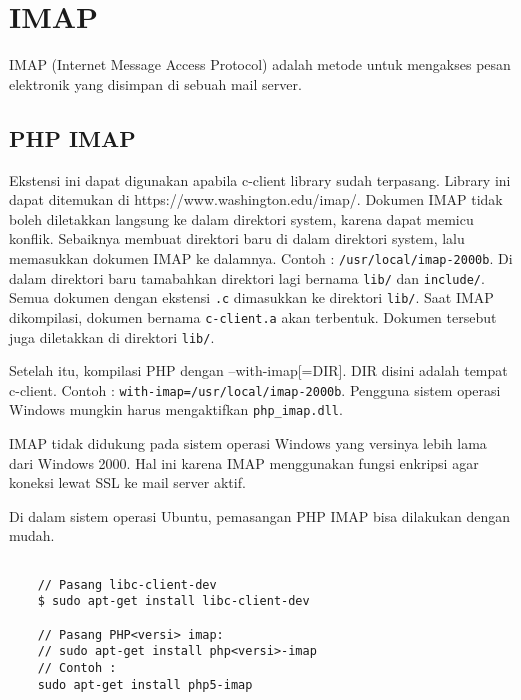 \section{IMAP}
\label{sec:IMAP}
IMAP (Internet Message Access Protocol) adalah metode untuk mengakses pesan elektronik yang disimpan di sebuah mail server.
\subsection{PHP IMAP ~\cite{php-imap}}
Ekstensi ini dapat digunakan apabila c-client library sudah terpasang. Library ini dapat ditemukan di https://www.washington.edu/imap/. Dokumen IMAP tidak boleh diletakkan langsung ke dalam direktori system, karena dapat memicu konflik. Sebaiknya membuat direktori baru di dalam direktori system, lalu memasukkan dokumen IMAP ke dalamnya. Contoh : \texttt{/usr/local/imap-2000b}. Di dalam direktori baru tamabahkan direktori lagi bernama \texttt{lib/} dan \texttt{include/}. Semua dokumen dengan ekstensi \texttt{.c} dimasukkan ke direktori \texttt{lib/}. Saat IMAP dikompilasi, dokumen bernama \texttt{c-client.a} akan terbentuk. Dokumen tersebut juga diletakkan di direktori \texttt{lib/}.

Setelah itu, kompilasi PHP dengan --with-imap[=DIR]. DIR disini adalah tempat c-client. Contoh : \texttt{with-imap=/usr/local/imap-2000b}. Pengguna sistem operasi Windows mungkin harus mengaktifkan \texttt{php\_imap.dll}.

IMAP tidak didukung pada sistem operasi Windows yang versinya lebih lama dari Windows 2000. Hal ini karena IMAP menggunakan fungsi enkripsi agar koneksi lewat SSL ke mail server aktif.

Di dalam sistem operasi Ubuntu, pemasangan PHP IMAP bisa dilakukan dengan mudah.
\begin{lstlisting}
	
	// Pasang libc-client-dev
	$ sudo apt-get install libc-client-dev

	// Pasang PHP<versi> imap:
	// sudo apt-get install php<versi>-imap
	// Contoh : 
	sudo apt-get install php5-imap
		
\end{lstlisting}

